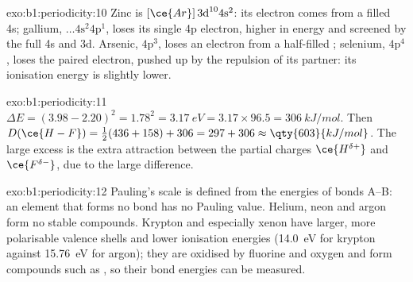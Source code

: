\begin{solution}{exo:b1:periodicity:10}
Zinc is $[\ce{Ar}]\,3\text{d}^{10} 4\text{s}^2$: its electron comes from a
filled 4s; gallium, $\dots 4\text{s}^2 4\text{p}^1$, loses its single 4p
electron, higher in energy and screened by the full 4s and 3d. Arsenic,
$4\text{p}^3$, loses an electron from a half-filled ; selenium,
$4\text{p}^4$, loses the paired electron, pushed up by the repulsion of
its partner: its ionisation energy is slightly lower.
\end{solution}

\begin{solution}{exo:b1:periodicity:11}
$\Delta E = (3.98 - 2.20)^2 = 1.78^2 = \qty{3.17}{eV} = 3.17 \times 96.5 =
\qty{306}{kJ/mol}$. Then $D(\ce{H-F}) = \tfrac12(436 + 158) + 306 = 297 +
306 \approx \qty{603}{kJ/mol}$. The large excess is the extra attraction
between the partial charges $\ce{H^{\delta+}}$ and $\ce{F^{\delta-}}$, due
to the large  difference.
\end{solution}

\begin{solution}{exo:b1:periodicity:12}
Pauling's scale is defined from the energies of bonds A--B: an element
that forms no bond has no Pauling value. Helium, neon and argon form no
stable compounds. Krypton and especially xenon have larger, more
polarisable valence shells and lower ionisation energies
(\qty{14.0}{eV} for krypton against \qty{15.76}{eV} for argon); they are
oxidised by fluorine and oxygen and form compounds such as , so
their bond energies can be measured.
\end{solution}

